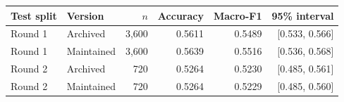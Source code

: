 \begin{tabular}{llrrrr}
\toprule
Test split & Version & $n$ & Accuracy & Macro-F1 & 95\% interval\\
\midrule
Round 1 & Archived & 3,600 & 0.5611 & 0.5489 & [0.533, 0.566] \\
Round 1 & Maintained & 3,600 & 0.5639 & 0.5516 & [0.536, 0.568] \\
Round 2 & Archived & 720 & 0.5264 & 0.5230 & [0.485, 0.561] \\
Round 2 & Maintained & 720 & 0.5264 & 0.5229 & [0.485, 0.560] \\
\bottomrule
\end{tabular}
